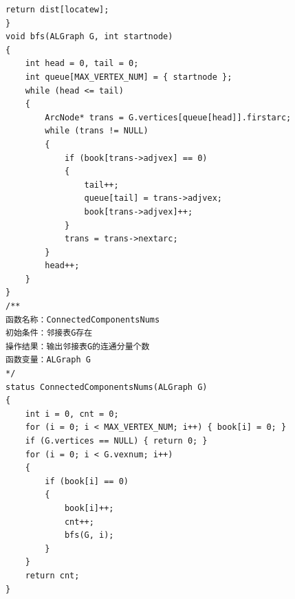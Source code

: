 \documentclass[supercite]{Experimental_Report}
\theoremstyle{definition}
\begin{document}
\begin{lstlisting}[title =函数实现,frame=none]
	return dist[locatew];
}
void bfs(ALGraph G, int startnode)
{
	int head = 0, tail = 0;
	int queue[MAX_VERTEX_NUM] = { startnode };
	while (head <= tail)
	{
		ArcNode* trans = G.vertices[queue[head]].firstarc;
		while (trans != NULL)
		{
			if (book[trans->adjvex] == 0)
			{
				tail++;
				queue[tail] = trans->adjvex;
				book[trans->adjvex]++;
			}
			trans = trans->nextarc;
		}
		head++;
	}
}
/**
函数名称：ConnectedComponentsNums
初始条件：邻接表G存在
操作结果：输出邻接表G的连通分量个数
函数变量：ALGraph G
*/
status ConnectedComponentsNums(ALGraph G)
{
	int i = 0, cnt = 0;
	for (i = 0; i < MAX_VERTEX_NUM; i++) { book[i] = 0; }
	if (G.vertices == NULL) { return 0; }
	for (i = 0; i < G.vexnum; i++)
	{
		if (book[i] == 0)
		{
			book[i]++;
			cnt++;
			bfs(G, i);
		}
	}
	return cnt;
}
\end{lstlisting}
\end{document}
